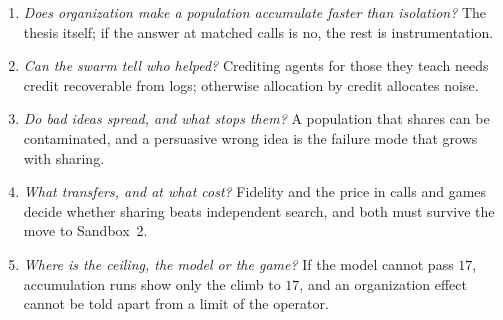 \documentclass[11pt]{article}
\numberwithin{theorem}{section}
\theoremstyle{definition}
\begin{document}
\begin{enumerate}[leftmargin=1.5em]
\item \emph{Does organization make a population accumulate faster than isolation?} The thesis itself; if the answer at
matched calls is no, the rest is instrumentation.
\item \emph{Can the swarm tell who helped?} Crediting agents for those they teach needs credit recoverable from logs;
otherwise allocation by credit allocates noise.
\item \emph{Do bad ideas spread, and what stops them?} A population that shares can be contaminated, and a persuasive
wrong idea is the failure mode that grows with sharing.
\item \emph{What transfers, and at what cost?} Fidelity and the price in calls and games decide whether sharing beats
independent search, and both must survive the move to Sandbox~2.
\item \emph{Where is the ceiling, the model or the game?} If the model cannot pass $17$, accumulation runs show only
the climb to $17$, and an organization effect cannot be told apart from a limit of the operator.
\end{enumerate}
\end{document}
